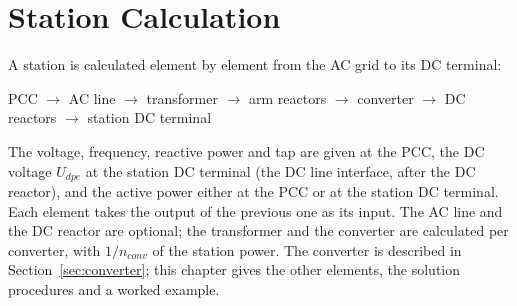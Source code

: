 \section{Station Calculation}
\label{sec:station}

A station is calculated element by element from the AC grid to its DC terminal:

\begin{center}
  PCC $\rightarrow$ AC line $\rightarrow$ transformer $\rightarrow$ arm reactors $\rightarrow$ converter
  $\rightarrow$ DC reactors $\rightarrow$ station DC terminal
\end{center}

The voltage, frequency, reactive power and tap are given at the PCC, the DC voltage $U_{dpe}$ at the station DC
terminal (the DC line interface, after the DC reactor), and the active power either at the PCC or at the station
DC terminal. Each element takes the output of the previous one as its input. The AC line and the DC reactor are
optional; the transformer and the converter are calculated per converter, with $1/n_{conv}$ of the station power.
The converter is described in Section~\ref{sec:converter}; this chapter gives the other elements, the solution
procedures and a worked example.





